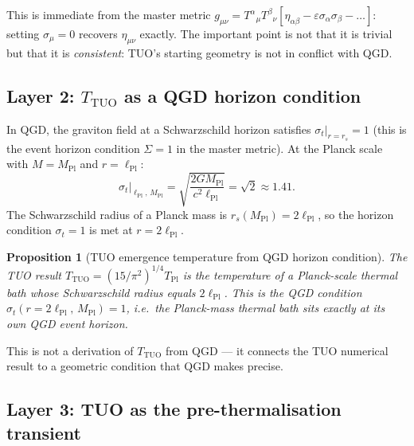 \documentclass[11pt,a4paper]{article}
\theoremstyle{plain}
\newtheorem{proposition}[theorem]{Proposition}
\theoremstyle{definition}
\theoremstyle{remark}
\newcommand{\sigt}{\sigma_t}
\newcommand{\rs}{r_s}
\newcommand{\lPl}{\ell_{\mathrm{Pl}}}
\newcommand{\TPl}{T_{\mathrm{Pl}}}
\newcommand{\TTUO}{T_{\mathrm{TUO}}}
\begin{document}
This is immediate from the master metric
$g_{\mu\nu} = T^\alpha{}_\mu T^\beta{}_\nu
[\eta_{\alpha\beta} - \varepsilon\sigma_\alpha\sigma_\beta - \ldots]$:
setting $\sigma_\mu = 0$ recovers $\eta_{\mu\nu}$ exactly.
The important point is not that it is trivial but that it is
\emph{consistent}: TUO's starting geometry is not in conflict with QGD.

\subsection{Layer 2: $T_{\mathrm{TUO}}$ as a QGD horizon condition}

In QGD, the graviton field at a Schwarzschild horizon satisfies
$\sigt\big|_{r=\rs} = 1$ (this is the event horizon condition $\Sigma = 1$
in the master metric).  At the Planck scale with $M = M_\mathrm{Pl}$ and
$r = \lPl$:
\begin{equation}
  \sigt\bigg|_{\lPl,\,M_\mathrm{Pl}}
  = \sqrt{\frac{2GM_\mathrm{Pl}}{c^2\lPl}}
  = \sqrt{2} \approx 1.41.
\end{equation}
The Schwarzschild radius of a Planck mass is $\rs(M_\mathrm{Pl}) = 2\lPl$,
so the horizon condition $\sigt = 1$ is met at $r = 2\lPl$.

\begin{proposition}[TUO emergence temperature from QGD horizon condition]
\label{prop:TTUO}
The TUO result $\TTUO = (15/\pi^2)^{1/4}\TPl$ is the temperature of
a Planck-scale thermal bath whose Schwarzschild radius equals $2\lPl$.
This is the QGD condition $\sigt(r = 2\lPl,\, M_\mathrm{Pl}) = 1$,
i.e.\ the Planck-mass thermal bath sits exactly at its own QGD event horizon.
\end{proposition}

This is not a derivation of $\TTUO$ from QGD --- it connects the TUO
numerical result to a geometric condition that QGD makes precise.

\subsection{Layer 3: TUO as the pre-thermalisation transient}
\end{document}
